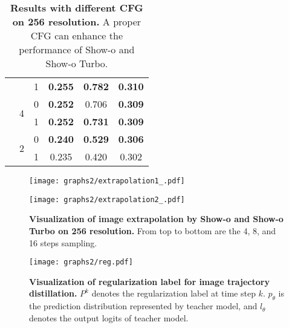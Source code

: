 \begin{table}[h]
\begin{tabular}{l c c c c c}
                            &                         & 1     & \textbf{0.255} & \textbf{0.782}  & \textbf{0.310} \\ 
                            \cline{2-6}
                            & \multirow{2}{*}{4}     & 0     & \textbf{0.252} & 0.706  & \textbf{0.309} \\
                            &                         & 1     & \textbf{0.252} & \textbf{0.731}  & \textbf{0.309} \\ 
                            \cline{2-6}
                            & \multirow{2}{*}{2}     & 0     & \textbf{0.240} & \textbf{0.529}  & \textbf{0.306} \\
                            &                         & 1     & 0.235 & 0.420  & 0.302 \\
\bottomrule
\end{tabular}
\caption{\textbf{Results with different CFG on 256 resolution.} A proper CFG can enhance the performance of Show-o and Show-o Turbo.}
\label{tab:CFG}
\end{table}



\begin{figure}[t]
    \centering
    \begin{minipage}[b]{\linewidth}
        \centering
        \texttt{[image: graphs2/extrapolation1\_.pdf]}
    \end{minipage}

    \vspace{0.2cm}

    \begin{minipage}[b]{\linewidth}
        \centering
        \texttt{[image: graphs2/extrapolation2\_.pdf]}
    \end{minipage}
    \vspace{-0.6cm}
    
    \caption{
        \small \textbf{Visualization of image extrapolation by Show-o and Show-o Turbo on 256 resolution.} From top to bottom are the 4, 8, and 16 steps sampling.
    }
    \label{fig:extrapolation}
\end{figure}



\begin{figure*}[t]
    \centering
    \texttt{[image: graphs2/reg.pdf]} 
    
    \caption{
            \small \textbf{Visualization of regularization label for image trajectory distillation.} $P^{k}$ denotes the regularization label at time step $k$. $p_{\theta}$ is the prediction distribution represented by teacher model, and $l_{\theta}$ denotes the output logits of teacher model.
    }
    \label{fig:reg}
\end{figure*}

